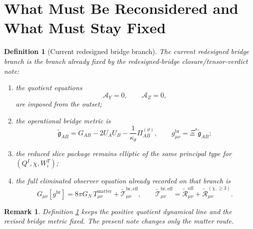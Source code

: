 \documentclass[11pt]{article}
\newcommand{\ReBridge}{\widetilde{\mathfrak{g}}}
\newcommand{\PiTheta}{\Pi^{(\vartheta)}}
\newcommand{\ReEff}{\widetilde{\mathcal T}_{\mu\nu}^{\mathrm{br,eff}}}
\newcommand{\ReLong}{\widetilde{\mathcal R}_{\mu\nu}^{(\chi,\ge 3)}}
\newcommand{\ReOff}{\widetilde{\mathcal R}_{\mu\nu}^{\mathrm{off}}}
\newcommand{\AY}{\mathcal A_Y}
\newcommand{\AZ}{\mathcal A_Z}
\newtheorem{definition}{Definition}
\newtheorem{remark}{Remark}
\begin{document}
\section{What Must Be Reconsidered and What Must Stay Fixed}

\begin{definition}[Current redesigned bridge branch]
\label{def:current}
The \emph{current redesigned bridge branch} is the branch already fixed by the redesigned-bridge closure/tensor-verdict note:
\begin{enumerate}
    \item the quotient equations
    \begin{equation}
    \AY=0,
    \qquad
    \AZ=0,
    \label{eq:AYAZ}
    \end{equation}
    are imposed from the outset;
    \item the operational bridge metric is
    \begin{equation}
    \ReBridge_{AB}
    =
    G_{AB}-2U_AU_B-\frac{1}{\kappa_\theta}\PiTheta_{AB},
    \qquad
    g^{\mathrm{br}}_{\mu\nu}=\Xi^\ast\ReBridge_{AB};
    \label{eq:gbr}
    \end{equation}
    \item the reduced slice package remains elliptic of the same principal type for \((Q^I,\chi,W_i^T)\);
    \item the full eliminated observer equation already recorded on that branch is
    \begin{equation}
    G_{\mu\nu}[g^{\mathrm{br}}]
    =
    8\pi G_N\,T_{\mu\nu}^{\mathrm{matter}}
    +\ReEff,
    \qquad
    \ReEff=\ReOff+\ReLong.
    \label{eq:oldobs}
    \end{equation}
\end{enumerate}
\end{definition}

\begin{remark}
Definition \ref{def:current} keeps the positive quotient dynamical line and the revised bridge metric fixed. The present note changes only the matter route.
\end{remark}
\end{document}
